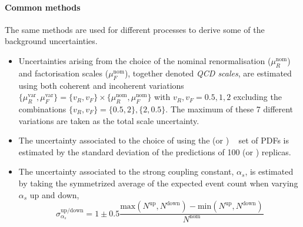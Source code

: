 \paragraph{Common methods} The same methods are used for different processes to derive some of the background uncertainties. 
\begin{itemize}
    \item Uncertainties arising from the choice of the nominal renormalisation ($\mu_R^\text{nom}$) and factorisation scales ($\mu_F^\text{nom}$), together denoted \emph{QCD scales}, are estimated using both coherent and incoherent variations $\{\mu^{\text{var}}_R , \mu^{\text{var}}_F \} = \{v_R, v_F \} \times \{\mu^{\text{nom}}_R , \mu^{\text{nom}}_F \}$ with $v_R, v_F = 0.5, 1, 2$ excluding the combinations $\{v_R, v_F \} = \{0.5, 2\}, \{2, 0.5\}$. 
    The maximum of these 7 different variations are taken as the total scale uncertainty.
    \item The uncertainty associated to the choice of using the \nnpdfnnlo (or \nnpdfnlo) ~\cite{Ball:2014uwa} set of PDFs is estimated by the standard deviation of the predictions of 100 \nnpdfnnlo (or \nnpdfnlo) replicas.
    \item The uncertainty associated to the strong coupling constant, $\alpha_s$, is estimated by taking the symmetrized average of the expected event count when varying $\alpha_s$ up and down, 
     \begin{equation}
        \sigma_{\alpha_s}^\text{up/down} = 1 \pm 0.5 \frac{ \text{max}(N^\text{up},N^\text{down}) - \text{min}(N^\text{up},N^\text{down})}{N^\text{nom}}
    \end{equation}

\end{itemize}

